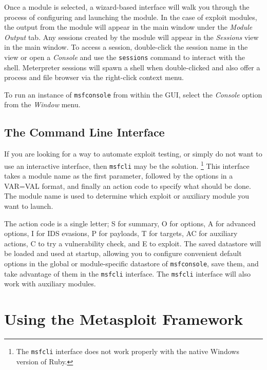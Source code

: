 \documentclass{report}
\begin{document}
\par
Once a module is selected, a wizard-based interface will walk you through the
process of configuring and launching the module. In the case of exploit modules,
the output from the module will appear in the main window under the
\textit{Module Output} tab. Any sessions created by the module will appear in
the \textit{Sessions} view in the main window. To access a session, double-click
the session name in the view or open a \textit{Console} and use the
\texttt{sessions} command to interact with the shell. Meterpreter sessions will
spawn a shell when double-clicked and also offer a process and file browser via
the right-click context menu.

\par
To run an instance of \texttt{msfconsole} from within the GUI, select the
\textit{Console} option from the \textit{Window} menu.

    \section{The Command Line Interface}
    \label{STARTED-CLI}

\par
If you are looking for a way to automate exploit testing, or simply do not want
to use an interactive interface, then \texttt{msfcli} may be the solution.
\footnote{The \texttt{msfcli} interface does not work properly with the native
Windows version of Ruby.} This interface takes a module name as the first
parameter, followed by the options in a VAR=VAL format, and finally an action
code to specify what should be done. The module name is used to determine which
exploit or auxiliary module you want to launch.

\par
The action code is a single letter; S for summary, O for options, A for advanced
options, I for IDS evasions, P for payloads, T for targets, AC for auxiliary
actions, C to try a vulnerability check, and E to exploit. The saved datastore
will be loaded and used at startup, allowing you to configure convenient default
options in the global or module-specific datastore of \texttt{msfconsole}, save
them, and take advantage of them in the \texttt{msfcli} interface. The
\texttt{msfcli} interface will also work with auxiliary modules.

\pagebreak

\chapter{Using the Metasploit Framework}
\end{document}
